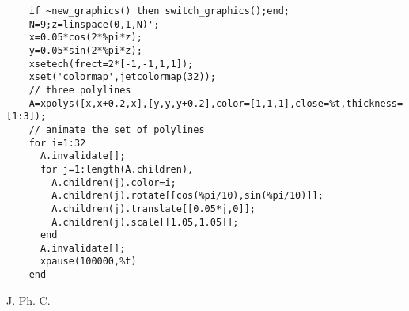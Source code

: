 \begin{examples}
  \begin{Verbatim}
    if ~new_graphics() then switch_graphics();end;
    N=9;z=linspace(0,1,N)';
    x=0.05*cos(2*%pi*z);
    y=0.05*sin(2*%pi*z);
    xsetech(frect=2*[-1,-1,1,1]);
    xset('colormap',jetcolormap(32));
    // three polylines
    A=xpolys([x,x+0.2,x],[y,y,y+0.2],color=[1,1,1],close=%t,thickness=[1:3]);
    // animate the set of polylines
    for i=1:32
      A.invalidate[];
      for j=1:length(A.children),
        A.children(j).color=i;
        A.children(j).rotate[[cos(%pi/10),sin(%pi/10)]];
        A.children(j).translate[[0.05*j,0]];
        A.children(j).scale[[1.05,1.05]];
      end
      A.invalidate[];
      xpause(100000,%t)
    end
  \end{Verbatim}
\end{examples}
\begin{manseealso}
    
\end{manseealso}
\begin{authors}
  J.-Ph. C.
\end{authors}
